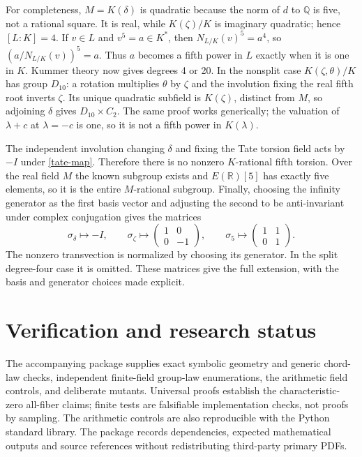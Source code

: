 \documentclass[11pt]{article}
\newcommand{\Q}{\mathbb Q}
\begin{document}
For completeness, $M=K(\delta)$ is quadratic because the norm of $d$
to $\Q$ is five, not a rational square. It is real, while
$K(\zeta)/K$ is imaginary quadratic; hence $[L:K]=4$.
If $v\in L$ and $v^5=a\in K^*$, then
$N_{L/K}(v)^5=a^4$, so $(a/N_{L/K}(v))^5=a$. Thus $a$ becomes a
fifth power in $L$ exactly when it is one in $K$. Kummer theory now
gives degrees 4 or 20. In the nonsplit case $K(\zeta,\theta)/K$ has
group $D_{10}$: a rotation multiplies $\theta$ by $\zeta$ and the
involution fixing the real fifth root inverts $\zeta$. Its unique
quadratic subfield is $K(\zeta)$, distinct from $M$, so adjoining
$\delta$ gives $D_{10}\times C_2$. The same proof works generically;
the valuation of $\lambda+c$ at $\lambda=-c$ is one, so it is not a
fifth power in $K(\lambda)$.

The independent involution changing $\delta$ and fixing the Tate
torsion field acts by $-I$ under \eqref{tate-map}. Therefore there is
no nonzero $K$-rational fifth torsion. Over the real field $M$ the
known subgroup exists and $E(\mathbb R)[5]$ has exactly five elements,
so it is the entire $M$-rational subgroup. Finally, choosing the
infinity generator as the first basis vector and adjusting the second
to be anti-invariant under complex conjugation gives the matrices
\[
\sigma_\delta\mapsto-I,\qquad
\sigma_\zeta\mapsto\begin{pmatrix}1&0\\0&-1\end{pmatrix},\qquad
\sigma_5\mapsto\begin{pmatrix}1&1\\0&1\end{pmatrix}.
\]
The nonzero transvection is normalized by choosing its generator. In
the split degree-four case it is omitted. These matrices give the
full extension, with the basis and generator choices made explicit.

\section{Verification and research status}
The accompanying package supplies exact symbolic geometry and
generic chord-law checks, independent finite-field group-law
enumerations, the arithmetic field controls, and deliberate mutants.
Universal proofs establish the characteristic-zero all-fiber claims;
finite tests are falsifiable implementation checks, not proofs by
sampling. The arithmetic controls are also reproducible with the
Python standard library. The package records dependencies, expected
mathematical outputs and source references without redistributing
third-party primary PDFs.
\end{document}
